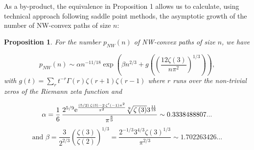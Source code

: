 \documentclass{article}
\newtheorem{proposition}[theorem]{Proposition}
\begin{document}
As a by-product, the equivalence in Proposition 1 allows us to
calculate, using technical approach \cite{Flajolet1991} following saddle point methods, the asymptotic growth of the number of NW-convex paths
of size $n$:

 \begin{proposition}
 For the number $p_{NW}(n)$ of NW-convex paths of size $n$, we have


 $$
p_{NW}(n) \sim\alpha n^{-11/18}
 \exp{\left(\beta
 n^{2/3}+g\left(\left(\frac{12\zeta(3)}{n\pi^2}\right)^{1/3}\right)\right)},
 $$
with $ g(t)=\sum_r t^{-r}\Gamma(r)\zeta(r+1)\zeta(r-1) $
where $r$ runs over the non-trivial zeros of the Riemann zeta function and

$$\alpha=\dfrac1{6}\,{\frac {{2}^{5/9}{{\rm e}^{{\frac {(5/2)\,\zeta  \left( 3 \right) -
2\,\zeta^\prime  \left(-1 \right) {\pi }^{2}}{{\pi }^{2}}}}}\sqrt [9]{
\zeta  \left( 3 \right) }{3}^{{\frac {11}{18}}}}{{\pi }^{{\frac {8}{9}
}}}}
\sim 0.3338488807...$$
 $$\mbox{and } \beta=\frac{3}{2^{2/3}}\left(\frac{\zeta(3)}{\zeta(2)}\right)^{1/3}= \dfrac{2^{-1/3} 3^{4/3}\zeta(3)^{1/3}}{\pi^{2/3}}\sim 1.702263426...$$
 \end{proposition}
\end{document}
